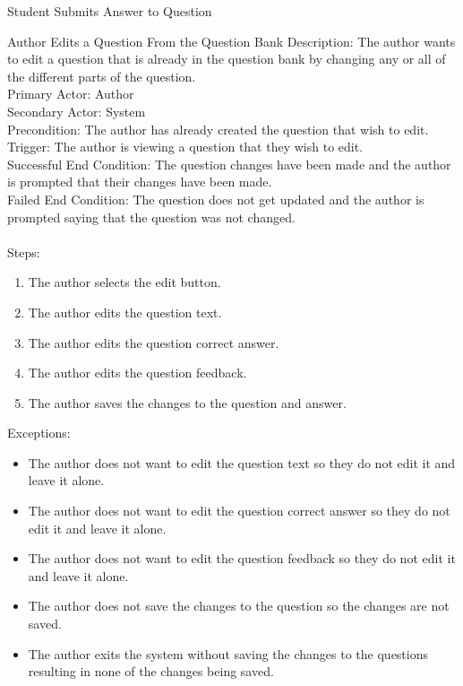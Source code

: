 \begin{section}{Student Submits Answer to Question}
    \begin{section}{Author Edits a Question From the Question Bank}
        Description: The author wants to edit a question that is already in the question bank by changing any or all of the different parts of the question. \\
        Primary Actor: Author \\
        Secondary Actor: System \\
        Precondition: The author has already created the question that wish to edit. \\
        Trigger: The author is viewing a question that they wish to edit. \\
        Successful End Condition: The question changes have been made and the author is prompted that their changes have been made. \\
        Failed End Condition: The question does not get updated and the author is prompted saying that the question was not changed. \\
        \\
        Steps:
        \begin{enumerate}
            \item{The author selects the edit button.}
            \item{The author edits the question text.}
            \item{The author edits the question correct answer.}
            \item{The author edits the question feedback.}
            \item{The author saves the changes to the question and answer.}
        \end{enumerate}
        Exceptions:
        \begin{itemize}
            \item{The author does not want to edit the question text so they do not edit it and leave it alone.}
            \item{The author does not want to edit the question correct answer so they do not edit it and leave it alone.}
            \item{The author does not want to edit the question feedback so they do not edit it and leave it alone.}
            \item{The author does not save the changes to the question so the changes are not saved.}
            \item{The author exits the system without saving the changes to the questions resulting in none of the changes being saved.}
        \end{itemize}
    \end{section}
    

\end{section}

